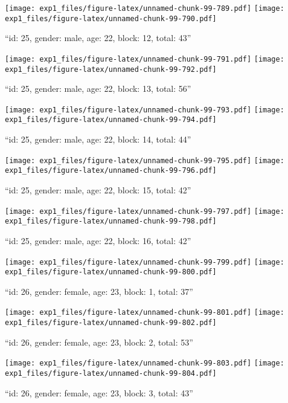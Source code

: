 \documentclass[,]{article}
\begin{document}
\texttt{[image: exp1\_files/figure-latex/unnamed-chunk-99-789.pdf]}
\texttt{[image: exp1\_files/figure-latex/unnamed-chunk-99-790.pdf]}

\newpage
[1] 

``id: 25, gender: male, age: 22, block: 12, total: 43''

\texttt{[image: exp1\_files/figure-latex/unnamed-chunk-99-791.pdf]}
\texttt{[image: exp1\_files/figure-latex/unnamed-chunk-99-792.pdf]}

\newpage
[1] 

``id: 25, gender: male, age: 22, block: 13, total: 56''

\texttt{[image: exp1\_files/figure-latex/unnamed-chunk-99-793.pdf]}
\texttt{[image: exp1\_files/figure-latex/unnamed-chunk-99-794.pdf]}

\newpage
[1] 

``id: 25, gender: male, age: 22, block: 14, total: 44''

\texttt{[image: exp1\_files/figure-latex/unnamed-chunk-99-795.pdf]}
\texttt{[image: exp1\_files/figure-latex/unnamed-chunk-99-796.pdf]}

\newpage
[1] 

``id: 25, gender: male, age: 22, block: 15, total: 42''

\texttt{[image: exp1\_files/figure-latex/unnamed-chunk-99-797.pdf]}
\texttt{[image: exp1\_files/figure-latex/unnamed-chunk-99-798.pdf]}

\newpage
[1] 

``id: 25, gender: male, age: 22, block: 16, total: 42''

\texttt{[image: exp1\_files/figure-latex/unnamed-chunk-99-799.pdf]}
\texttt{[image: exp1\_files/figure-latex/unnamed-chunk-99-800.pdf]}

\newpage
[1] 

``id: 26, gender: female, age: 23, block: 1, total: 37''

\texttt{[image: exp1\_files/figure-latex/unnamed-chunk-99-801.pdf]}
\texttt{[image: exp1\_files/figure-latex/unnamed-chunk-99-802.pdf]}

\newpage
[1] 

``id: 26, gender: female, age: 23, block: 2, total: 53''

\texttt{[image: exp1\_files/figure-latex/unnamed-chunk-99-803.pdf]}
\texttt{[image: exp1\_files/figure-latex/unnamed-chunk-99-804.pdf]}

\newpage
[1] 

``id: 26, gender: female, age: 23, block: 3, total: 43''
\end{document}
